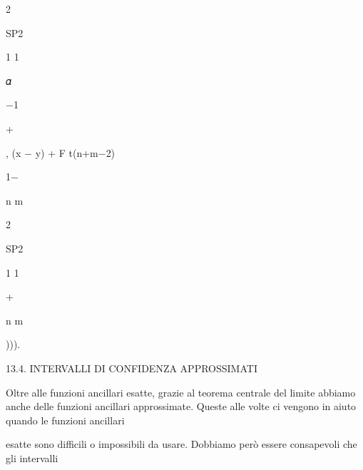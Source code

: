 \documentclass[a4paper,portrait,12pt]{article}
\begin{document}
2





\begin{flushleft}
SP2
\end{flushleft}





1 1


\begin{flushleft}
𝛼
\end{flushleft}


$-$1


+


\begin{flushleft}
, (x $-$ y) + F t(n+m$-$2)
\end{flushleft}


1$-$


\begin{flushleft}
n m
\end{flushleft}


2





\begin{flushleft}
SP2
\end{flushleft}





1 1


+


\begin{flushleft}
n m
\end{flushleft}





))).





\begin{flushleft}
13.4. INTERVALLI DI CONFIDENZA APPROSSIMATI
\end{flushleft}


\begin{flushleft}
Oltre alle funzioni ancillari esatte, grazie al teorema centrale del limite abbiamo anche delle funzioni ancillari approssimate. Queste alle volte ci vengono in aiuto quando le funzioni ancillari
\end{flushleft}


\begin{flushleft}
esatte sono difficili o impossibili da usare. Dobbiamo per\`{o} essere consapevoli che gli intervalli
\end{flushleft}
\end{document}
